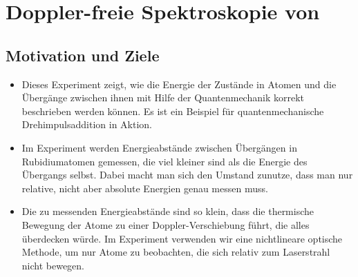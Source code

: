 
\chapter*{Doppler-freie Spektroskopie von }
	
\section{Motivation und Ziele}

\begin{itemize}
	\item Dieses Experiment zeigt, wie die Energie der Zustände in Atomen und die Übergänge zwischen ihnen mit Hilfe der Quantenmechanik korrekt beschrieben werden können. Es ist ein Beispiel für quantenmechanische Drehimpulsaddition in Aktion.
	
	\item Im Experiment werden Energieabstände zwischen Übergängen in Rubidiumatomen gemessen, die viel kleiner sind als die Energie des Übergangs selbst. Dabei macht man sich den Umstand zunutze, dass man nur relative, nicht aber absolute Energien genau messen muss.
	
	\item Die zu messenden Energieabstände sind so klein, dass die thermische Bewegung der Atome zu einer Doppler-Verschiebung führt, die alles überdecken würde. Im Experiment verwenden wir eine nichtlineare optische Methode, um nur Atome zu beobachten, die sich  relativ zum Laserstrahl nicht bewegen.
\end{itemize}


\newcommand{\auftraege}{%
\section{Arbeitsaufträge}

\begin{itemize}
	\item Messen Sie ein Doppler-freies Spektrum der D2-Linien von Rubidium und geben Sie die zugehörigen Übergänge an.
	\item Bestimmen Sie den Dipol- und den Quadrupol-Term der Hyperfeinstrukturkonstanten (inkl. Messunsicherheit).
	\item Messen Sie das Doppler-verbreiterte Absorptionsspektrum bei verschiedenen Temperaturen und modellieren Sie die Linienform.
	\item Bonus: Untersuchen Sie den Einfluss der Leistung von Abfrage- und Sättigungsstrahl.
	\item Bonus: Versuchen Sie, möglichste schmale Linien zu erreichen. 
	\item Bonus: Vergleichen Sie die Amplituden der Linien mit einem passenden Modell.
\end{itemize}
}

